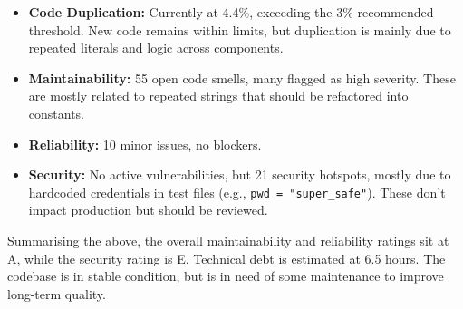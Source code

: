 \begin{itemize}
    \item \textbf{Code Duplication:} Currently at 4.4\%, exceeding the 3\% recommended threshold. New code remains within limits, but duplication is mainly due to repeated literals and logic across components.
    
    \item \textbf{Maintainability:} 55 open code smells, many flagged as high severity. These are mostly related to repeated strings that should be refactored into constants.
    
    \item \textbf{Reliability:} 10 minor issues, no blockers.
    
    \item \textbf{Security:} No active vulnerabilities, but 21 security hotspots, mostly due to hardcoded credentials in test files (e.g., \texttt{pwd = "super\_safe"}). These don’t impact production but should be reviewed.
\end{itemize}

Summarising the above, the overall maintainability and reliability ratings sit at A, while the security rating is E. Technical debt is estimated at 6.5 hours. The codebase is in stable condition, but is in need of some maintenance to improve long-term quality.



